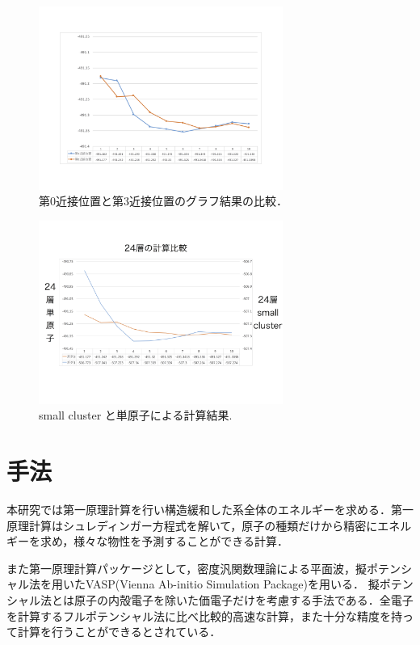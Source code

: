 \documentclass[a4j,twocolumn]{jsarticle}
\begin{document}
\begin{figure}[h]
\vspace{0\baselineskip}
\begin{center}
   \includegraphics[width=80mm]{../png/0_3garaf.png}
  \caption{第0近接位置と第3近接位置のグラフ結果の比較\cite{tochigi}．\label{glaf}}
  \label{fig:one}
\end{center}
\end{figure}

\begin{figure}[h]
\vspace{0\baselineskip}
\begin{center}
   \includegraphics[width=80mm]{../png/24_small_single.png}
  \caption{small cluster と単原子による計算結果\cite{tochigi}. \label{glaf}}
  \label{fig:two}
\end{center}
\end{figure}

\section{手法}

本研究では第一原理計算を行い構造緩和した系全体のエネルギーを求める．第一原理計算はシュレディンガー方程式を解いて，原子の種類だけから精密にエネルギーを求め，様々な物性を予測することができる計算．

また第一原理計算パッケージとして，密度汎関数理論による平面波，擬ポテンシャル法を用いたVASP(Vienna Ab-initio Simulation Package)を用いる．
擬ポテンシャル法とは原子の内殻電子を除いた価電子だけを考慮する手法である．全電子を計算するフルポテンシャル法に比べ比較的高速な計算，また十分な精度を持って計算を行うことができるとされている．
\end{document}
